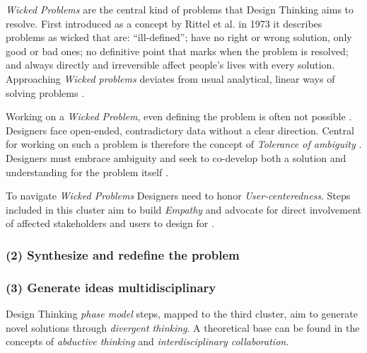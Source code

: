 \documentclass[draft,twoside]{vutinfth}
\begin{document}
                \textit{Wicked Problems} are the central kind of problems that Design Thinking aims to resolve. First introduced as a concept by 
                Rittel et al. in 1973 \cite{rittelDilemmasGeneralTheory1973} it describes problems as wicked that are: ``ill-defined''; have no right or wrong 
                solution, only good or bad ones; no definitive point that marks when the problem is resolved; and always directly and irreversible affect people's lives
                with every solution. Approaching \textit{Wicked problems} deviates from usual analytical, linear ways of solving problems \cite{micheliDoingDesignThinking2019}. 

                Working on a \textit{Wicked Problem}, even defining the problem is often not possible \cite{rittelDilemmasGeneralTheory1973}. Designers face 
                open-ended, contradictory data without a clear direction. Central for working on such a problem is therefore 
                the concept of \textit{Tolerance of ambiguity} \cite{micheliDoingDesignThinking2019}. Designers must embrace ambiguity and seek to co-develop 
                both a solution and understanding for the problem itself \cite{micheliDoingDesignThinking2019}. 
                
                To navigate \textit{Wicked Problems} Designers need to honor \textit{User-centeredness}. Steps included in this cluster aim to 
                build \textit{Empathy} and advocate for direct involvement of affected stakeholders and users to design for \cite{micheliDoingDesignThinking2019}. 

            \subsubsection{(2) Synthesize and redefine the problem}



            \subsubsection{(3) Generate ideas multidisciplinary}
                
                Design Thinking \textit{phase model} steps, mapped to the third cluster, aim to generate novel solutions through \textit{divergent thinking}. 
                A theoretical base can be found in the concepts of \textit{abductive thinking} and \textit{interdisciplinary collaboration}. 
\end{document}
